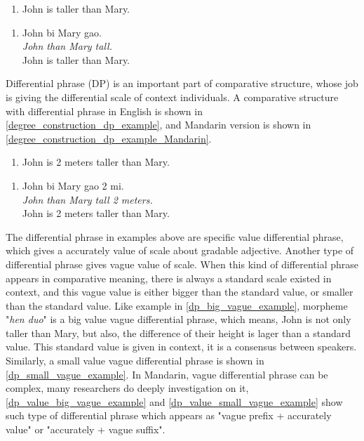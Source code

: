 \documentclass{ctexart}
\let \cite \parencite
\begin{document}
\begin{enumerate}
    \item \label{degree_construction_example}
    John is taller than Mary.
\end{enumerate}

\begin{enumerate}
    \item \label{degree_construction_example_Mandarin}
    John bi Mary gao.  \\
    \textit{John than Mary tall.} \\
    John is taller than Mary.
\end{enumerate}

\noindent
Differential phrase (DP) is an important part of comparative structure, whose job is giving the differential scale of context individuals. A comparative structure with differential phrase in English is shown in \ref{degree_construction_dp_example}, and Mandarin version is shown in \ref{degree_construction_dp_example_Mandarin}.

\begin{enumerate}
    \item \label{degree_construction_dp_example}
    John is 2 meters taller than Mary.
\end{enumerate}

\begin{enumerate}
    \item \label{degree_construction_dp_example_Mandarin}
    John bi Mary gao 2 mi.  \\
    \textit{John than Mary tall 2 meters.} \\
    John is 2 meters taller than Mary.
\end{enumerate}

\noindent
The differential phrase in examples above are specific value differential phrase, which gives a accurately value of scale about gradable adjective. Another type of differential phrase gives vague value of scale. When this kind of differential phrase appears in comparative meaning, there is always a standard scale existed in context, and this vague value is either bigger than the standard value, or smaller than the standard value. Like example in \ref{dp_big_vague_example}, morpheme "\textit{hen duo}" is a big value vague differential phrase, which means, John is not only taller than Mary, but also, the difference of their height is lager than a standard value. This standard value is given in context, it is a consensus between speakers. Similarly, a small value vague differential phrase is shown in \ref{dp_small_vague_example}. In Mandarin, vague differential phrase can be complex, many researchers \cite{lin2014,li2015} do deeply investigation on it, \ref{dp_value_big_vague_example} and \ref{dp_value_small_vague_example} show such type of differential phrase which appears as "vague prefix + accurately value" or "accurately + vague suffix".
\end{document}
